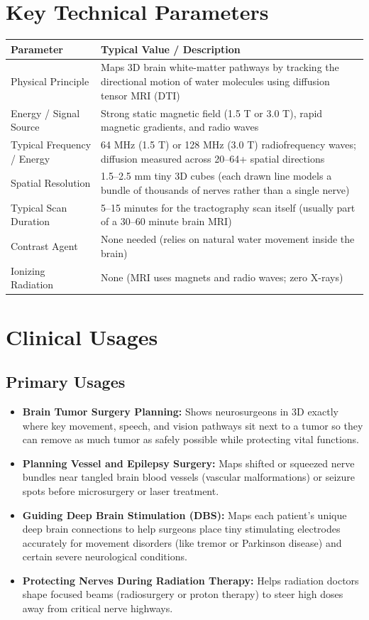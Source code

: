 \section{Key Technical Parameters}

\noindent\begin{tabularx}{\textwidth}{@{}l X@{}}
\toprule
\textbf{Parameter} & \textbf{Typical Value / Description} \\
\midrule
Physical Principle & Maps 3D brain white-matter pathways by tracking the directional motion of water molecules using diffusion tensor MRI (DTI) \\
Energy / Signal Source & Strong static magnetic field (1.5 T or 3.0 T), rapid magnetic gradients, and radio waves \\
Typical Frequency / Energy & 64 MHz (1.5 T) or 128 MHz (3.0 T) radiofrequency waves; diffusion measured across 20--64+ spatial directions \\
Spatial Resolution & 1.5--2.5 mm tiny 3D cubes (each drawn line models a bundle of thousands of nerves rather than a single nerve) \\
Typical Scan Duration & 5--15 minutes for the tractography scan itself (usually part of a 30--60 minute brain MRI) \\
Contrast Agent & None needed (relies on natural water movement inside the brain) \\
Ionizing Radiation & None (MRI uses magnets and radio waves; zero X-rays) \\
\bottomrule
\end{tabularx}

\section{Clinical Usages}

\subsection{Primary Usages}

\begin{itemize}
    \item \textbf{Brain Tumor Surgery Planning:} Shows neurosurgeons in 3D exactly where key movement, speech, and vision pathways sit next to a tumor so they can remove as much tumor as safely possible while protecting vital functions.
    \item \textbf{Planning Vessel and Epilepsy Surgery:} Maps shifted or squeezed nerve bundles near tangled brain blood vessels (vascular malformations) or seizure spots before microsurgery or laser treatment.
    \item \textbf{Guiding Deep Brain Stimulation (DBS):} Maps each patient's unique deep brain connections to help surgeons place tiny stimulating electrodes accurately for movement disorders (like tremor or Parkinson disease) and certain severe neurological conditions.
    \item \textbf{Protecting Nerves During Radiation Therapy:} Helps radiation doctors shape focused beams (radiosurgery or proton therapy) to steer high doses away from critical nerve highways.
\end{itemize}

